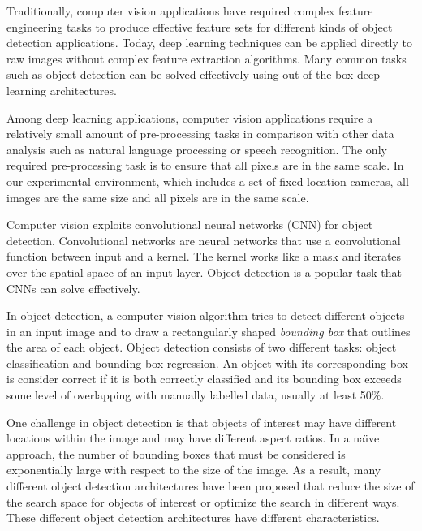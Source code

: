 \documentclass[conference]{IEEEtran}
\newcommand{\alnote}[1]{ {\textcolor{blue} { ***andre: #1 }}}
\newcommand{\alnote}[1]{}
\begin{document}
Traditionally, computer vision applications have required complex feature engineering tasks to produce effective feature sets for different kinds of object detection applications. 
Today, deep learning techniques can be applied directly to raw images without complex feature extraction algorithms. Many common tasks such as object detection can be solved effectively using out-of-the-box deep learning architectures.

Among deep learning applications, computer vision applications require a relatively small amount of pre-processing tasks in comparison with other data analysis  such as natural language processing or speech recognition. 
The only required pre-processing task is to ensure that all pixels are in the same scale. 
In our experimental environment, which includes a set of fixed-location cameras, all images are the same size and all pixels are in the same scale.

Computer vision exploits convolutional neural networks (CNN) for object detection. 
Convolutional networks are neural networks that use a convolutional function between input and a kernel. The kernel works like a mask and iterates over the spatial space of an input layer. 
Object detection is a popular task that CNNs can solve effectively. 



In object detection, a computer vision algorithm tries to detect different objects in an input image and to draw a rectangularly shaped {\em bounding box} that outlines the area of each object. 
Object detection consists of two different tasks: object classification and bounding box regression. 
An object with its corresponding box is consider correct if it is both correctly classified and its bounding box exceeds some level of overlapping with manually labelled data, usually at least 50\%. 

One challenge in object detection is that objects of interest may have different locations within the image and may have different aspect ratios.  
In a na\"{\i}ve approach, the number of bounding boxes that must be considered is exponentially large with respect to the size of the image.  
As a result, many different object detection architectures have been proposed that reduce the size of the search space for objects of interest or optimize the search in different ways.  
These different object detection architectures have different characteristics. 
\end{document}
